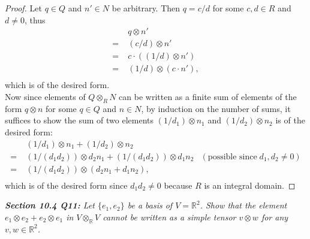 \documentclass{article}
\begin{document}
  \begin{proof}
    Let $q\in Q$ and $n'\in N$ be arbitrary. Then $q=c/d$ for some $c,d\in
    R$ and $d\neq0$, thus
    \begin{align*}
      &\;q\otimes n'\\
      =&\;(c/d)\otimes n'\\
      =&\;c\cdot((1/d)\otimes n')\\
      =&\;(1/d)\otimes (c\cdot n'),\\
    \end{align*}
    which is of the desired form. \\

    Now since elements of $Q\otimes_R N$ can
    be written as a finite sum of elements of the form $q\otimes n$ for
    some $q\in Q$ and $n\in N$, by induction on the number of sums, it
    suffices to show the sum of two elements $(1/d_1)\otimes n_1$ and
    $(1/d_2)\otimes n_2$ is of the desired form:
    \begin{align*}
      &\;(1/d_1)\otimes n_1 +(1/d_2)\otimes n_2\\
      =&\;(1/(d_1d_2))\otimes d_2n_1 +(1/(d_1d_2))\otimes d_1n_2
      &(\text{possible since}\; d_1,d_2\neq0)\\
      =&\;(1/(d_1d_2))\otimes(d_2n_1+d_1n_2),\\
    \end{align*}
    which is of the desired form since $d_1d_2\neq0$ because $R$ is an
    integral domain.
  \end{proof}

\it \textbf{Section 10.4 Q11:} Let $\{e_1,e_2\}$ be a basis of
  $V=\mathbb{R}^2$. Show that the element $e_1\otimes e_2+e_2\otimes e_1$
  in $V\otimes_\mathbb{R}V$ cannot be written as a simple tensor $v\otimes
  w$ for any $v,w\in\mathbb{R}^2$.
\end{document}
